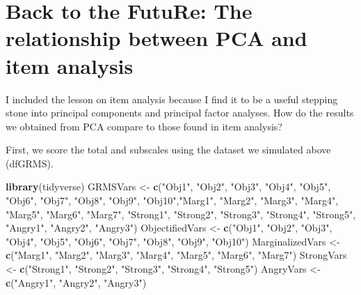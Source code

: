 \documentclass[
  english,
]{book}
\newenvironment{Shaded}{\begin{snugshade}}{\end{snugshade}}
\newcommand{\KeywordTok}[1]{\textcolor[rgb]{0.13,0.29,0.53}{\textbf{#1}}}
\newcommand{\NormalTok}[1]{#1}
\newcommand{\StringTok}[1]{\textcolor[rgb]{0.31,0.60,0.02}{#1}}
\begin{document}
\hypertarget{back-to-the-future-the-relationship-between-pca-and-item-analysis}{%
\section{Back to the FutuRe: The relationship between PCA and item analysis}\label{back-to-the-future-the-relationship-between-pca-and-item-analysis}}

I included the lesson on item analysis because I find it to be a useful stepping stone into principal components and principal factor analyses. How do the results we obtained from PCA compare to those found in item analysis?

First, we score the total and subscales using the dataset we simulated above (dfGRMS).

\begin{Shaded}
\begin{Highlighting}[]
\KeywordTok{library}\NormalTok{(tidyverse)}
\NormalTok{GRMSVars <-}\StringTok{ }\KeywordTok{c}\NormalTok{(}\StringTok{"Obj1"}\NormalTok{, }\StringTok{"Obj2"}\NormalTok{, }\StringTok{"Obj3"}\NormalTok{, }\StringTok{"Obj4"}\NormalTok{, }\StringTok{"Obj5"}\NormalTok{, }\StringTok{"Obj6"}\NormalTok{, }\StringTok{"Obj7"}\NormalTok{, }\StringTok{"Obj8"}\NormalTok{, }\StringTok{"Obj9"}\NormalTok{, }\StringTok{"Obj10"}\NormalTok{,}\StringTok{"Marg1"}\NormalTok{, }\StringTok{"Marg2"}\NormalTok{, }\StringTok{"Marg3"}\NormalTok{, }\StringTok{"Marg4"}\NormalTok{, }\StringTok{"Marg5"}\NormalTok{, }\StringTok{"Marg6"}\NormalTok{, }\StringTok{"Marg7"}\NormalTok{, }\StringTok{"Strong1"}\NormalTok{, }\StringTok{"Strong2"}\NormalTok{, }\StringTok{"Strong3"}\NormalTok{, }\StringTok{"Strong4"}\NormalTok{, }\StringTok{"Strong5"}\NormalTok{, }\StringTok{"Angry1"}\NormalTok{, }\StringTok{"Angry2"}\NormalTok{, }\StringTok{"Angry3"}\NormalTok{)}
\NormalTok{ObjectifiedVars <-}\StringTok{ }\KeywordTok{c}\NormalTok{(}\StringTok{"Obj1"}\NormalTok{, }\StringTok{"Obj2"}\NormalTok{, }\StringTok{"Obj3"}\NormalTok{, }\StringTok{"Obj4"}\NormalTok{, }\StringTok{"Obj5"}\NormalTok{, }\StringTok{"Obj6"}\NormalTok{, }\StringTok{"Obj7"}\NormalTok{, }\StringTok{"Obj8"}\NormalTok{, }\StringTok{"Obj9"}\NormalTok{, }\StringTok{"Obj10"}\NormalTok{)}
\NormalTok{MarginalizedVars <-}\StringTok{ }\KeywordTok{c}\NormalTok{(}\StringTok{"Marg1"}\NormalTok{, }\StringTok{"Marg2"}\NormalTok{, }\StringTok{"Marg3"}\NormalTok{, }\StringTok{"Marg4"}\NormalTok{, }\StringTok{"Marg5"}\NormalTok{, }\StringTok{"Marg6"}\NormalTok{, }\StringTok{"Marg7"}\NormalTok{)}
\NormalTok{StrongVars <-}\StringTok{ }\KeywordTok{c}\NormalTok{(}\StringTok{"Strong1"}\NormalTok{, }\StringTok{"Strong2"}\NormalTok{, }\StringTok{"Strong3"}\NormalTok{, }\StringTok{"Strong4"}\NormalTok{, }\StringTok{"Strong5"}\NormalTok{)}
\NormalTok{AngryVars <-}\StringTok{ }\KeywordTok{c}\NormalTok{(}\StringTok{"Angry1"}\NormalTok{, }\StringTok{"Angry2"}\NormalTok{, }\StringTok{"Angry3"}\NormalTok{)}


\end{Highlighting}
\end{Shaded}
\end{document}

